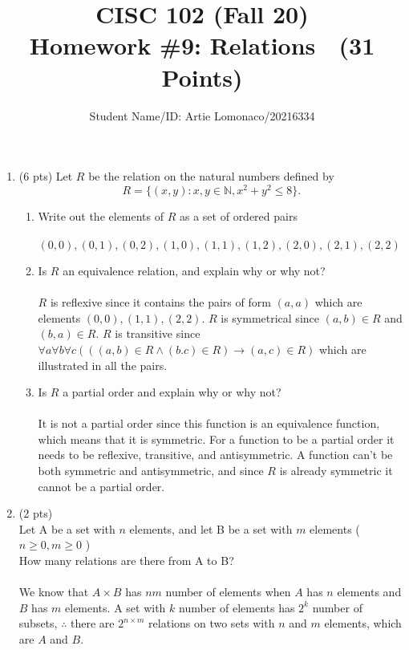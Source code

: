 \documentclass[12pt]{article}
\title{CISC 102 (Fall 20)\\ Homework \#9: Relations $\;$   (31 Points) }
\author{Student Name/ID: Artie Lomonaco/20216334}
\date{}
\begin{document}
\maketitle


\begin{enumerate}

\item (6 pts)
Let $R$ be the relation on the natural numbers defined by
\[ R = \{(x, y): x, y \in \mathbb{N}, x^2 + y^2 \leq 8\}.\]
\begin{enumerate}
	\item Write out the elements of $R$ as a set of ordered pairs\\
    \\$(0,0),(0,1),(0,2),(1,0),(1,1),(1,2),(2,0),(2,1),(2,2)$
	\item Is $R$ an equivalence relation, and explain why or why not?\\
    \\ $R$ is reflexive since it contains the pairs of form $(a,a)$ which are elements $(0,0),(1,1),(2,2)$. $R$ is symmetrical since $(a,b) \in R$ and $(b,a) \in R$. $R$ is transitive since $\forall a \forall b \forall c (((a,b) \in R \land (b.c) \in R) \rightarrow (a,c) \in R)$ which are illustrated in all the pairs.
	\item Is $R$ a partial order and explain why or why not?\\
    \\It is not a partial order since this function is an equivalence function, which means that it is symmetric. For a function to be a partial order it needs to be reflexive, transitive, and antisymmetric. A function can't be both symmetric and antisymmetric, and since $R$ is already symmetric it cannot be a partial order.
\end{enumerate}
\item (2 pts) \\
Let A be a set with \(n\) elements, and let B be a set with \(m\) elements  ( \(n \ge 0 , m \ge 0\) )
\leavevmode\\\relax
How many relations are there from A to B?\\
\\We know that $A \times B$ has $nm$ number of elements when $A$ has $n$ elements and $B$ has $m$ elements. A set with $k$ number of elements has $2^k$ number of subsets, $\therefore$ there are $2^{n\times m}$ relations on two sets with $n$ and $m$ elements, which are $A$ and $B$.


\end{enumerate}
\end{document}
